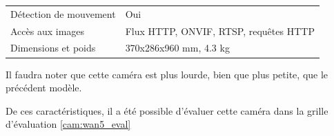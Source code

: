 \begin{table}[H]
\begin{tabular}{@{}ll@{}}
    Détection de mouvement & Oui                                                                                                                                                                                                                                                                                         \\ [0.8ex]
    Accès aux images       & Flux HTTP, ONVIF, RTSP, requêtes HTTP                                                                                                                                                                                                                                                       \\ [0.8ex]
    Dimensions et poids    & 370x286x960 mm, 4.3 kg                                                                                                                                                                                                                                                                      \\ \bottomrule
    \end{tabular}
\end{table}

Il faudra noter que cette caméra est plus lourde, bien que plus petite, que le précédent modèle. 

De ces caractéristiques, il a été possible d'évaluer cette caméra dans la grille d'évaluation \ref{cam:wan5_eval} 

